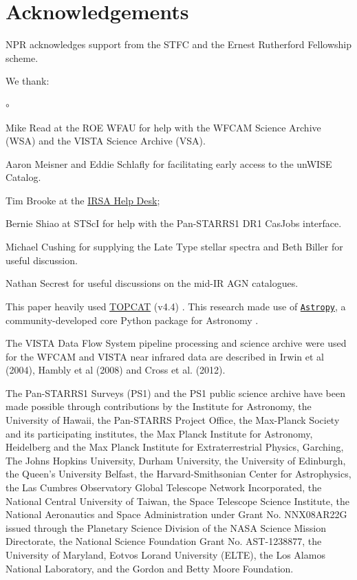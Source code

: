 \documentclass[usenatbib]{mnras}
\begin{document}
\section*{Acknowledgements}
NPR acknowledges support from the STFC and the Ernest Rutherford Fellowship scheme. 

We thank:
\begin{list}{$\circ$}{}  
  \item Mike Read at the ROE WFAU for help with the WFCAM Science Archive (WSA) and the VISTA Science Archive (VSA). 
  \item Aaron Meisner and Eddie Schlafly for facilitating early access to the unWISE Catalog. 
  \item Tim Brooke at the \href{https://irsasupport.ipac.caltech.edu/index.php}{IRSA Help Desk}; 
  \item Bernie Shiao at STScI for help with the Pan-STARRS1 DR1 CasJobs interface. 
  \item Michael Cushing for supplying the Late Type stellar spectra and Beth Biller for useful discussion. 
  \item Nathan Secrest for useful discussions on the mid-IR AGN catalogues. 
\end{list}


This paper heavily used \href{http://www.star.bris.ac.uk/~mbt/topcat/}{TOPCAT} (v4.4)
\citep[][]{Taylor2005, Taylor2011}.
This research made use of \href{http://www.astropy.org}{\tt Astropy}, 
a community-developed core Python package for Astronomy 
\citep{AstropyCollaboration2013, AstropyCollaboration2018}.

The VISTA Data Flow System pipeline processing and science archive were used for the WFCAM and VISTA 
near infrared data are described in Irwin et al (2004), Hambly et al (2008) and Cross et al. (2012). 

The Pan-STARRS1 Surveys (PS1) and the PS1 public science archive have
been made possible through contributions by the Institute for
Astronomy, the University of Hawaii, the Pan-STARRS Project Office,
the Max-Planck Society and its participating institutes, the Max
Planck Institute for Astronomy, Heidelberg and the Max Planck
Institute for Extraterrestrial Physics, Garching, The Johns Hopkins
University, Durham University, the University of Edinburgh, the
Queen's University Belfast, the Harvard-Smithsonian Center for
Astrophysics, the Las Cumbres Observatory Global Telescope Network
Incorporated, the National Central University of Taiwan, the Space
Telescope Science Institute, the National Aeronautics and Space
Administration under Grant No. NNX08AR22G issued through the Planetary
Science Division of the NASA Science Mission Directorate, the National
Science Foundation Grant No. AST-1238877, the University of Maryland,
Eotvos Lorand University (ELTE), the Los Alamos National Laboratory,
and the Gordon and Betty Moore Foundation.
\end{document}
